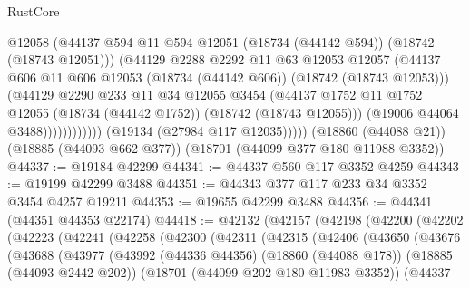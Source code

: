 \begin{lexlean}{RustCore}
\begin{coremodule}
                            @12058
                            (@44137
                              @594
                              @11
                              @594
                              @12051
                              (@18734 (@44142 @594))
                              (@18742 (@18743 @12051)))
                            (@44129
                              @2288
                              @2292
                              @11
                              @63
                              @12053
                              @12057
                              (@44137
                                @606
                                @11
                                @606
                                @12053
                                (@18734 (@44142 @606))
                                (@18742 (@18743 @12053)))
                              (@44129
                                @2290
                                @233
                                @11
                                @34
                                @12055
                                @3454
                                (@44137
                                  @1752
                                  @11
                                  @1752
                                  @12055
                                  (@18734 (@44142 @1752))
                                  (@18742 (@18743 @12055)))
                                (@19006 @44064 @3488))))))))))))
          (@19134 (@27984 @117 @12035)))))
    (@18860 (@44088 @21))
    (@18885 (@44093 @662 @377))
    (@18701 (@44099 @377 @180 @11988 @3352))
@44337 := @19184 @42299
@44341 := @44337 @560 @117 @3352 @4259
@44343 := @19199 @42299 @3488
@44351 := @44343 @377 @117 @233 @34 @3352 @3454 @4257 @19211
@44353 := @19655 @42299 @3488
@44356 := @44341 (@44351 @44353 @22174)
@44418 := @42132
    (@42157
      (@42198
        (@42200
          (@42202
            (@42223
              (@42241
                (@42258
                  (@42300
                    (@42311
                      (@42315
                        (@42406
                          (@43650
                            (@43676
                              (@43688
                                (@43977
                                  (@43992
                                    (@44336 @44356)
                                    (@18860 (@44088 @178))
                                    (@18885 (@44093 @2442 @202))
                                    (@18701 (@44099 @202 @180 @11983 @3352))
                                    (@44337

\end{coremodule}
\end{lexlean}
